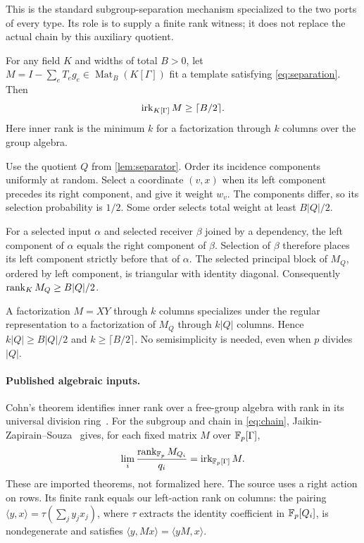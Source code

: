 This is the standard subgroup-separation mechanism specialized to the
two ports of every type. Its role is to supply a finite rank witness;
it does not replace the actual chain by this auxiliary quotient.

\begin{proposition}\label{prop:inner-rank}
\notformalized
For any field $K$ and widths of total $B>0$, let
$M=I-\sum_eT_eg_e\in\operatorname{Mat}_B(K[\Gamma])$ fit a template
satisfying \eqref{eq:separation}. Then
\[
 \operatorname{irk}_{K[\Gamma]}M\ge\lceil B/2\rceil.
\]
Here inner rank is the minimum $k$ for a factorization through $k$
columns over the group algebra.
\end{proposition}
\begin{informalproof}
Use the quotient $Q$ from \cref{lem:separator}. Order its incidence
components uniformly at random. Select a coordinate $(v,x)$ when
its left component precedes its right component, and give it weight
$w_v$. The components differ, so its selection probability is $1/2$.
Some order selects total weight at least $B|Q|/2$.

For a selected input $\alpha$ and selected receiver $\beta$ joined
by a dependency, the left component of $\alpha$ equals the right
component of $\beta$. Selection of $\beta$ therefore places its left
component strictly before that of $\alpha$. The selected principal
block of $M_Q$, ordered by left component, is triangular with identity
diagonal. Consequently $\operatorname{rank}_K M_Q\ge B|Q|/2$.

A factorization $M=XY$ through $k$ columns specializes under the
regular representation to a factorization of $M_Q$ through $k|Q|$
columns. Hence $k|Q|\ge B|Q|/2$ and $k\ge\lceil B/2\rceil$.
No semisimplicity is needed, even when $p$ divides $|Q|$.
\end{informalproof}

\paragraph{Published algebraic inputs.}
Cohn's theorem identifies inner rank over a free-group algebra with
rank in its universal division ring~\cite{Cohn,JaikinSouza}.
For the subgroup and chain in \eqref{eq:chain},
Jaikin-Zapirain--Souza~\cite[Theorem~8.1]{JaikinSouza} gives, for
each fixed matrix $M$ over $\mathbb{F}_p[\Gamma]$,
\begin{equation}\label{eq:rank-approx}
 \lim_i\frac{\operatorname{rank}_{\mathbb{F}_p}M_{Q_i}}{q_i}
       =\operatorname{irk}_{\mathbb{F}_p[\Gamma]}M.
\end{equation}
These are imported theorems, not formalized here. The source uses a
right action on rows. Its finite rank equals our left-action rank on
columns: the pairing $\langle y,x\rangle=\tau(\sum_jy_jx_j)$,
where $\tau$ extracts the identity coefficient in $\mathbb{F}_p[Q_i]$,
is nondegenerate and satisfies $\langle y,Mx\rangle=\langle yM,x\rangle$.

